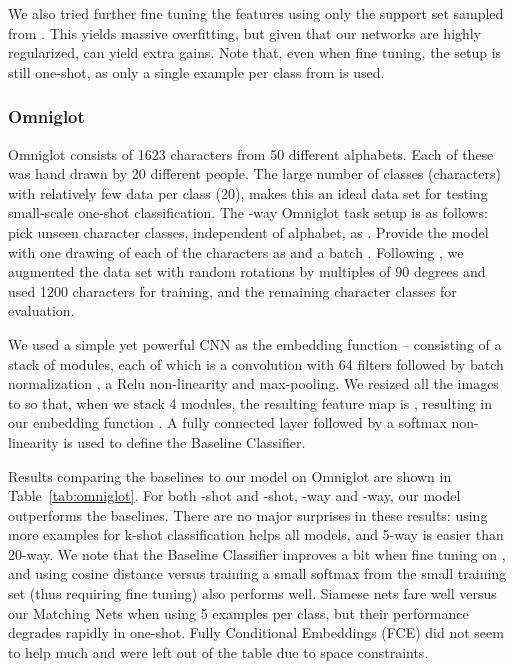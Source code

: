 We also tried further fine tuning the features using only the support set  sampled from . This yields massive overfitting, but given that our networks are highly regularized, can yield extra gains. Note that, even when fine tuning, the setup is still one-shot, as only a single example per class from  is used.

\subsubsection{Omniglot}

Omniglot \cite{omniglot} consists of 1623 characters from 50 different alphabets.
Each of these was hand drawn by 20 different people.
The large number of classes (characters) with relatively few data per class (20),
makes this an ideal data set for testing small-scale one-shot classification.
The -way Omniglot task setup is as follows: pick  unseen character classes, independent of alphabet, as .
Provide the model with one drawing of each of the  characters as  and a batch .
Following \cite{mann},  we augmented the data set with random rotations by multiples of 90 degrees and used 1200 characters for training, and the remaining character classes for evaluation.

We used a simple yet powerful CNN as the embedding function -- consisting of a stack of modules, each of which is a  convolution with 64 filters followed by batch normalization \cite{ioffe2015batch}, a Relu non-linearity and  max-pooling. We resized all the images to  so that, when we stack 4 modules, the resulting feature map is , resulting in our embedding function . A fully connected layer followed by a softmax non-linearity is used to define the Baseline Classifier.

Results comparing the baselines to our model on Omniglot are shown in Table~\ref{tab:omniglot}.
For both -shot and -shot, -way and -way, our model outperforms the baselines. There are no major surprises in these results: using more examples for k-shot classification helps all models, and 5-way is easier than 20-way. We note that the Baseline Classifier improves a bit when fine tuning on , and using cosine distance versus training a small softmax from the small training set (thus requiring fine tuning) also performs well. Siamese nets fare well versus our Matching Nets when using 5 examples per class, but their performance degrades rapidly in one-shot. Fully Conditional Embeddings (FCE) did not seem to help much and were left out of the table due to space constraints.

